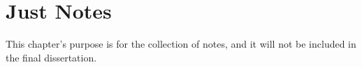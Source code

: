 \chapter*{Just Notes}
This chapter's purpose is for the collection of notes, and it will not be included in the final dissertation.
